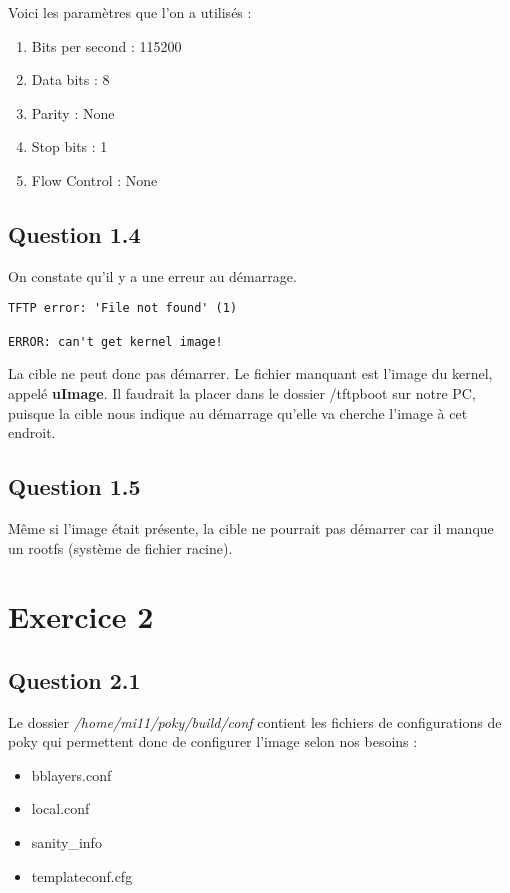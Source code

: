 \documentclass[a4paper,12pt]{report}
\begin{document}
Voici les paramètres que l'on a utilisés :
\begin{enumerate}
\item Bits per second : 115200
\item Data bits : 8
\item Parity : None
\item Stop bits : 1
\item Flow Control : None
\end{enumerate}

\subsection{Question 1.4}
On constate qu'il y a une erreur au démarrage.

\begin{lstlisting}
TFTP error: 'File not found' (1)

ERROR: can't get kernel image!
\end{lstlisting}

La cible ne peut donc pas démarrer. Le fichier manquant est l'image du kernel, appelé \textbf{uImage}.
Il faudrait la placer dans le dossier /tftpboot sur notre PC, puisque la cible nous indique au démarrage qu'elle va cherche l'image à cet endroit.

\subsection{Question 1.5}
Même si l'image était présente, la cible ne pourrait pas démarrer car il manque un rootfs (système de fichier racine).

\section{Exercice 2}
\subsection{Question 2.1}
Le dossier \textit{/home/mi11/poky/build/conf} contient les fichiers de configurations de poky qui permettent donc de configurer l'image selon nos besoins :
\begin{itemize}
\item bblayers.conf
\item local.conf
\item sanity\_info
\item templateconf.cfg
\end{itemize}
\end{document}

